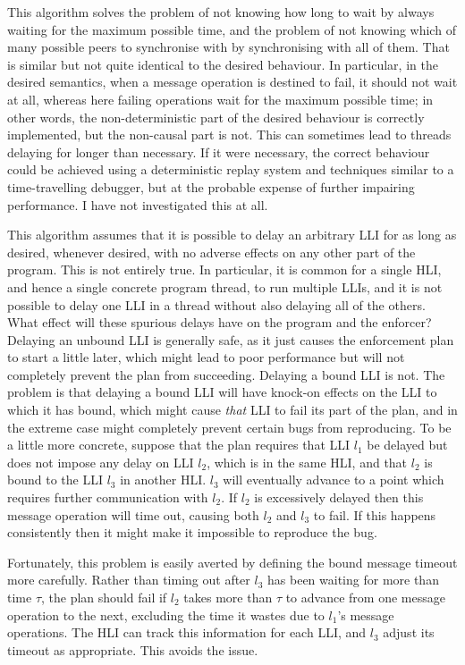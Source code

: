 This algorithm solves the problem of not knowing how long to wait by
always waiting for the maximum possible time, and the problem of not
knowing which of many possible peers to synchronise with by
synchronising with all of them.  That is similar but not quite
identical to the desired behaviour.  In particular, in the desired
semantics, when a message operation is destined to fail, it should not
wait at all, whereas here failing operations wait for the maximum
possible time; in other words, the non-deterministic part of the
desired behaviour is correctly implemented, but the non-causal part is
not.  This can sometimes lead to threads delaying for longer than
necessary.  If it were necessary, the correct behaviour could be
achieved using a deterministic replay system\cite{Choi1998} and
techniques similar to a time-travelling debugger\cite{Xu2003}, but at
the probable expense of further impairing performance.  I have not
investigated this at all.

This algorithm assumes that it is possible to delay an arbitrary LLI
for as long as desired, whenever desired, with no adverse effects on
any other part of the program.  This is not entirely true.  In
particular, it is common for a single HLI, and hence a single concrete
program thread, to run multiple LLIs, and it is not possible to delay
one LLI in a thread without also delaying all of the others.  What
effect will these spurious delays have on the program and the
enforcer?  Delaying an unbound LLI is generally safe, as it just
causes the enforcement plan to start a little later, which might lead
to poor performance but will not completely prevent the plan from
succeeding.  Delaying a bound LLI is not.  The problem is that
delaying a bound LLI will have knock-on effects on the LLI to which it
has bound, which might cause \emph{that} LLI to fail its part of the
plan, and in the extreme case might completely prevent certain bugs
from reproducing.  To be a little more concrete, suppose that the plan
requires that LLI $l_1$ be delayed but does not impose any delay on
LLI $l_2$, which is in the same HLI, and that $l_2$ is bound to the
LLI $l_3$ in another HLI.  $l_3$ will eventually advance to a point
which requires further communication with $l_2$.  If $l_2$ is
excessively delayed then this message operation will time out, causing
both $l_2$ and $l_3$ to fail.  If this happens consistently then it
might make it impossible to reproduce the bug.

Fortunately, this problem is easily averted by defining the bound
message timeout more carefully.  Rather than timing out after $l_3$
has been waiting for more than time $\tau$, the plan should fail if
$l_2$ takes more than $\tau$ to advance from one message operation to
the next, excluding the time it wastes due to $l_1$'s message
operations.  The HLI can track this information for each LLI, and
$l_3$ adjust its timeout as appropriate.  This avoids the
issue.

